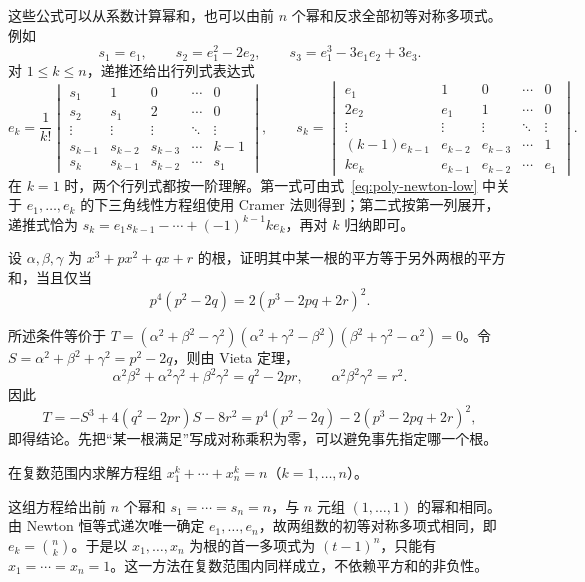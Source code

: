 这些公式可以从系数计算幂和，也可以由前 $n$ 个幂和反求全部初等对称多项式。例如
\[
    s_1=e_1,\qquad s_2=e_1^2-2e_2,\qquad
    s_3=e_1^3-3e_1e_2+3e_3.
\]
对 $1\leq k\leq n$，递推还给出行列式表达式
\begin{equation}
\label{eq:poly-newton-determinants}
    e_k=\frac1{k!}
    \begin{vmatrix}
    s_1&1&0&\cdots&0\\
    s_2&s_1&2&\cdots&0\\
    \vdots&\vdots&\vdots&\ddots&\vdots\\
    s_{k-1}&s_{k-2}&s_{k-3}&\cdots&k-1\\
    s_k&s_{k-1}&s_{k-2}&\cdots&s_1
    \end{vmatrix},\qquad
    s_k=
    \begin{vmatrix}
    e_1&1&0&\cdots&0\\
    2e_2&e_1&1&\cdots&0\\
    \vdots&\vdots&\vdots&\ddots&\vdots\\
    (k-1)e_{k-1}&e_{k-2}&e_{k-3}&\cdots&1\\
    ke_k&e_{k-1}&e_{k-2}&\cdots&e_1
    \end{vmatrix}.
\end{equation}
在 $k=1$ 时，两个行列式都按一阶理解。第一式可由式~\eqref{eq:poly-newton-low} 中关于 $e_1,\ldots,e_k$ 的下三角线性方程组使用 Cramer 法则得到；第二式按第一列展开，递推式恰为 $s_k=e_1s_{k-1}-\cdots+(-1)^{k-1}ke_k$，再对 $k$ 归纳即可。

\begin{example}
\label{ex:poly-symmetric-root-condition}
设 $\alpha,\beta,\gamma$ 为 $x^3+px^2+qx+r$ 的根，证明其中某一根的平方等于另外两根的平方和，当且仅当
\[
    p^4(p^2-2q)=2(p^3-2pq+2r)^2.
\]
\end{example}
\begin{solve}
所述条件等价于 $T=(\alpha^2+\beta^2-\gamma^2)(\alpha^2+\gamma^2-\beta^2)(\beta^2+\gamma^2-\alpha^2)=0$。令 $S=\alpha^2+\beta^2+\gamma^2=p^2-2q$，则由 Vieta 定理，
\[
    \alpha^2\beta^2+\alpha^2\gamma^2+\beta^2\gamma^2=q^2-2pr,
    \qquad \alpha^2\beta^2\gamma^2=r^2.
\]
因此
\[
    T=-S^3+4(q^2-2pr)S-8r^2
    =p^4(p^2-2q)-2(p^3-2pq+2r)^2,
\]
即得结论。先把“某一根满足”写成对称乘积为零，可以避免事先指定哪一个根。
\end{solve}

\begin{example}
\label{ex:poly-newton-system}
在复数范围内求解方程组 $x_1^k+\cdots+x_n^k=n$（$k=1,\ldots,n$）。
\end{example}
\begin{solve}
这组方程给出前 $n$ 个幂和 $s_1=\cdots=s_n=n$，与 $n$ 元组 $(1,\ldots,1)$ 的幂和相同。由 Newton 恒等式递次唯一确定 $e_1,\ldots,e_n$，故两组数的初等对称多项式相同，即 $e_k=\binom nk$。于是以 $x_1,\ldots,x_n$ 为根的首一多项式为 $(t-1)^n$，只能有 $x_1=\cdots=x_n=1$。这一方法在复数范围内同样成立，不依赖平方和的非负性。
\end{solve}

